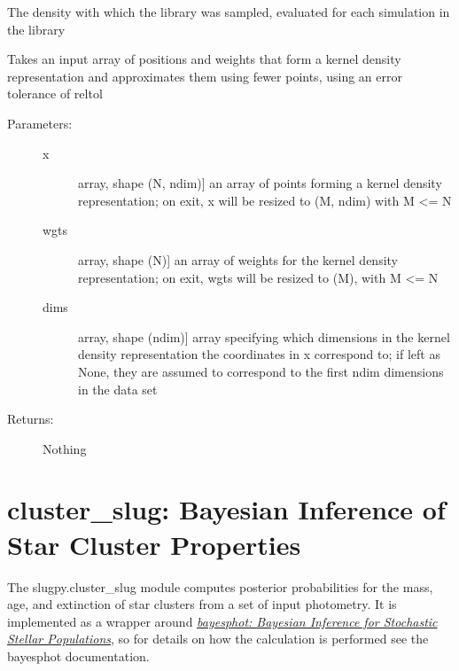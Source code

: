 \documentclass[letterpaper,10pt,english]{sphinxmanual}
\begin{document}
\begin{fulllineitems}
\begin{fulllineitems}
\label{bayesphot:slugpy.bayesphot.bp.bp.sample_density}
The density with which the library was sampled, evaluated for
each simulation in the library

\end{fulllineitems}


\begin{fulllineitems}
\label{bayesphot:slugpy.bayesphot.bp.bp.squeeze_rep}
Takes an input array of positions and weights that form a
kernel density representation and approximates them using
fewer points, using an error tolerance of reltol
\begin{description}
\item[{Parameters:}] \leavevmode\begin{description}
\item[{x}] \leavevmode{[}array, shape (N, ndim){]}
an array of points forming a kernel density
representation; on exit, x will be resized to (M, ndim)
with M \textless{}= N

\item[{wgts}] \leavevmode{[}array, shape (N){]}
an array of weights for the kernel density
representation; on exit, wgts will be resized to (M),
with M \textless{}= N

\item[{dims}] \leavevmode{[}array, shape (ndim){]}
array specifying which dimensions in the kernel density
representation the coordinates in x correspond to; if
left as None, they are assumed to correspond to the
first ndim dimensions in the data set

\end{description}

\item[{Returns:}] \leavevmode
Nothing

\end{description}

\end{fulllineitems}


\end{fulllineitems}



\chapter{cluster\_slug: Bayesian Inference of Star Cluster Properties}
\label{cluster_slug:sec-cluster-slug}\label{cluster_slug::doc}\label{cluster_slug:cluster-slug-bayesian-inference-of-star-cluster-properties}
The slugpy.cluster\_slug module computes posterior probabilities for the mass, age, and extinction of star clusters from a set of input photometry.  It is implemented as a wrapper around {\hyperref[bayesphot:sec-bayesphot]{\emph{bayesphot: Bayesian Inference for Stochastic Stellar Populations}}}, so for details on how the calculation is performed see the bayesphot documentation.
\end{document}
